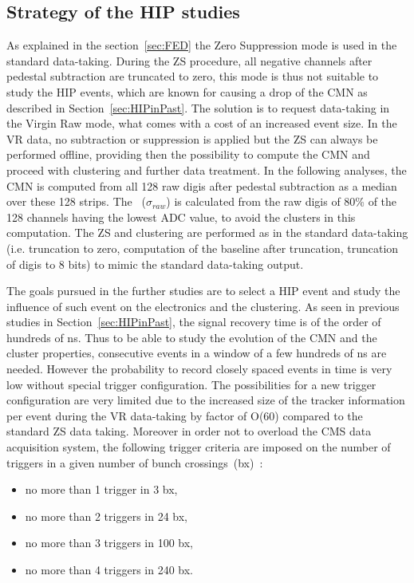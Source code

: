 \subsection{Strategy of the HIP studies~\label{sec:strategy}}

As explained in the section~\ref{sec:FED} the Zero Suppression mode is used in the standard data-taking. During the ZS procedure, all negative channels after pedestal subtraction are truncated to zero, this mode is thus not suitable to study the HIP events, which are known for causing a drop of the CMN as described in Section~\ref{sec:HIPinPast}. The solution is to request data-taking in the Virgin Raw mode, what comes with a cost of an increased event size. In the VR data, no subtraction or suppression is applied but the ZS can always be performed offline, providing then the possibility to compute the CMN and proceed with clustering and further data treatment. In the following analyses, the CMN is computed from all 128 raw digis after pedestal subtraction as a median over these 128 strips. The \SD~($\sigma_{raw}$) is calculated from the raw digis of 80\% of the 128 channels having the lowest ADC value, to avoid the clusters in this computation. The ZS and clustering are performed as in the standard data-taking (i.e. truncation to zero, computation of the baseline after truncation, truncation of digis to 8 bits) to mimic the standard data-taking output.

The goals pursued in the further studies are to select a HIP event and study the influence of such event on the electronics and the clustering. As seen in previous studies in Section~\ref{sec:HIPinPast}, the signal recovery time is of the order of hundreds of ns. Thus to be able to study the evolution of the CMN and the cluster properties, consecutive events in a window of a few hundreds of ns are needed. However the probability to record closely spaced events in time is very low without special trigger configuration. The possibilities for a new trigger configuration are very limited due to the increased size of the tracker information per event during the VR data-taking by factor of O(60) compared to the standard ZS data taking. Moreover in order not to overload the CMS data acquisition system, the following trigger criteria are imposed on the number of triggers in a given number of bunch crossings~(bx)~\cite{website:VRtrigger}:

\begin{itemize}
\item{no more than 1 trigger in 3 bx,}
\item{no more than 2 triggers in 24 bx,}
\item{no more than 3 triggers in 100 bx,}
\item{no more than 4 triggers in 240 bx.}
\end{itemize}

